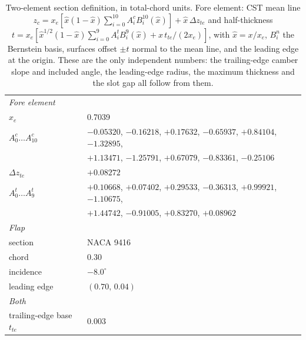 \begin{table}[H]
  \centering\footnotesize
  \setlength{\tabcolsep}{4pt}
  \caption{Two-element section definition, in total-chord units. Fore
  element: CST mean line
  $z_c=x_e[\hat x(1-\hat x)\sum_{i=0}^{10}A^{c}_iB^{10}_i(\hat x)]
  +\hat x\,\Delta z_{te}$ and half-thickness
  $t=x_e[\hat x^{1/2}(1-\hat x)\sum_{i=0}^{9}A^{t}_iB^{9}_i(\hat x)
  +\hat x\,t_{te}/(2x_e)]$, with $\hat x=x/x_e$, $B^{n}_i$ the Bernstein
  basis, surfaces offset $\pm t$ normal to the mean line, and the leading
  edge at the origin. These are the only independent numbers: the
  trailing-edge camber slope and included angle, the leading-edge radius,
  the maximum thickness and the slot gap all follow from them.}
  \label{t:twoelementgeom}
  \begin{tabular}{ll}
    \toprule
    \multicolumn{2}{l}{\emph{Fore element}}\\
    $x_e$ & 0.7039 \\
    $A^{c}_0\ldots A^{c}_{10}$ &
      $-0.05320$, $-0.16218$, $+0.17632$, $-0.65937$, $+0.84104$, $-1.32895$, \\
    & $+1.13471$, $-1.25791$, $+0.67079$, $-0.83361$, $-0.25106$ \\
    $\Delta z_{te}$ & $+0.08272$ \\
    $A^{t}_0\ldots A^{t}_{9}$ &
      $+0.10668$, $+0.07402$, $+0.29533$, $-0.36313$, $+0.99921$, $-1.10675$, \\
    & $+1.44742$, $-0.91005$, $+0.83270$, $+0.08962$ \\
    \midrule
    \multicolumn{2}{l}{\emph{Flap}}\\
    section & NACA 9416 \\
    chord & 0.30 \\
    incidence & $-8.0^\circ$ \\
    leading edge & $(0.70,\,0.04)$ \\
    \midrule
    \multicolumn{2}{l}{\emph{Both}}\\
    trailing-edge base $t_{te}$ & 0.003 \\
    \bottomrule
  \end{tabular}
\end{table}
